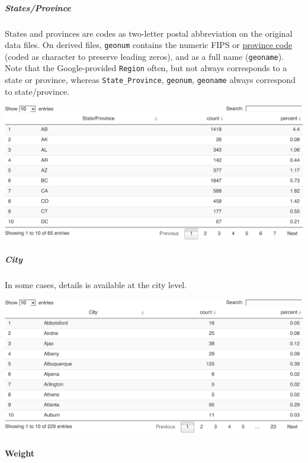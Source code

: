\documentclass[
]{article}
\begin{document}
\hypertarget{statesprovince}{%
\subparagraph{States/Province}\label{statesprovince}}

States and provinces are codes as two-letter postal abbreviation on the
original data files. On derived files, \texttt{geonum} contains the
numeric FIPS or
\href{https://www12.statcan.gc.ca/census-recensement/2011/ref/dict/table-tableau/table-tableau-8-eng.cfm}{province
code} (coded as character to preserve leading zeros), and as a full name
(\texttt{geoname}). Note that the Google-provided \texttt{Region} often,
but not always corresponds to a state or province, whereas
\texttt{State\_Province}, \texttt{geonum}, \texttt{geoname} always
correspond to state/province.

\includegraphics{expectations-codebook_files/figure-latex/details_state_province-1.pdf}

\hypertarget{city}{%
\subparagraph{City}\label{city}}

In some cases, details is available at the city level.

\includegraphics{expectations-codebook_files/figure-latex/details_cities-1.pdf}

\hypertarget{weight}{%
\paragraph{Weight}\label{weight}}
\end{document}
